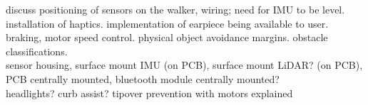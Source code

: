 \noindent discuss positioning of sensors on the walker, wiring; need for IMU to be level. installation of haptics. implementation of earpiece being available to user. braking, motor speed control. physical object avoidance margins. obstacle classifications.\\

\noindent sensor housing, surface mount IMU (on PCB), surface mount LiDAR? (on PCB), PCB centrally mounted, bluetooth module centrally mounted?\\

\noindent headlights? curb assist? tipover prevention with motors explained\\